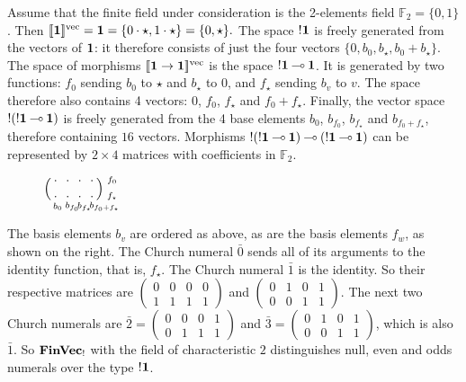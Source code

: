 \documentclass[10pt]{article}
\theoremstyle{plain}
\theoremstyle{definition}
\newcommand{\loli}{\mathbin{\multimap}}
\newcommand{\FinVec}{\mbox{\bf FinVec}}
\newcommand{\tunit}{{\bf 1}}
\newcommand{\fvdenot}[1]{{[\![{#1}]\!]^{\rm vec}}}
\begin{document}
  Assume that the finite field under consideration is the 2-elements
  field $\mathbb{F}_2=\{0,1\}$. Then
  $
  \fvdenot{\tunit} = \tunit = \{0\cdot\star,1\cdot\star\} = \{0,\star\}.
  $
  The space $!\tunit$ is freely generated from the vectors of $\tunit$: it
  therefore consists of just the four vectors $\{0,b_0,b_\star,b_0+b_\star\}$.
  The space of morphisms $\fvdenot{\tunit\to\tunit}$ is the space
  ${!\tunit}\loli\tunit$. It is generated by two functions:
  $f_0$ sending $b_0$ to $\star$ and $b_\star$ to $0$, and $f_\star$
  sending $b_v$ to $v$. The space 
  therefore also contains 4 vectors: $0$, $f_0$, $f_\star$ and
  $f_0+f_\star$. Finally, the vector space ${!}({!\tunit}\loli\tunit)$
  is freely generated from the 4 base elements $b_0$, $b_{f_0}$,
  $b_{f_\star}$ and $b_{f_0+f_\star}$, therefore containing $16$
  vectors. Morphisms
  $!({!\tunit}\loli\tunit)\loli({!\tunit}\loli\tunit)$ can be
  represented by $2\times 4$ matrices with coefficients in
  $\mathbb{F}_2$. 
\begin{wrapfigure}{r}{0.24\textwidth}
\begin{minipage}{.2\textwidth}
  $\xy
  <1.5ex,0ex>:
  (1,0)*{\cdot};
  (0,1)*{\Big(\Big.};
  (1,2)*{\cdot};
  (2.5,0)*{\cdot};
  (2.5,2)*{\cdot};
  (4,0)*{\cdot};
  (4,2)*{\cdot};
  (5.5,0)*{\cdot};
  (5.5,2)*{\cdot};
  (6.5,1)*{\Big.\Big)};
  (8,0.1)*\txt{{\scriptsize $f_\star$}};
  (8,2.1)*\txt{{\scriptsize $f_0$}};
  (0.7,-1.2)*!L\txt{{\scriptsize $b_{0}$}};
  (2.2,-1.2)*!L\txt{{\scriptsize $b_{f_0}$}};
  (3.7,-1.2)*!L\txt{{\scriptsize $b_{f_\star}$}};
  (5.2,-1.2)*!L\txt{{\scriptsize $b_{f_0+f_\star}$}};
  \endxy$
\end{minipage}
\end{wrapfigure}
The basis elements $b_v$ are ordered as above, as
  are the basis elements $f_w$, as shown on the right.
  The Church numeral $\bar{0}$ sends all of its arguments to the
  identity function, that is, $f_\star$. The Church numeral $\bar{1}$
  is the identity. So their respective matrices are
  $\left(\begin{smallmatrix}
    0&0&0&0\\
    1&1&1&1
  \end{smallmatrix}\right)$
  and
  $\left(\begin{smallmatrix}
    0&1&0&1\\
    0&0&1&1
  \end{smallmatrix}\right)$.
  The next two Church numerals are
  $\bar{2} = 
  \left(\begin{smallmatrix}
    0&0&0&1
    \\
    0&1&1&1
  \end{smallmatrix}\right)$ and
  $\bar{3} = 
  \left(\begin{smallmatrix}
    0&1&0&1\\
    0&0&1&1
  \end{smallmatrix}\right)$, which is also $\bar{1}$.
  So ${\FinVec}_!$ with the field of characteristic $2$ distinguishes
  null, even and odds numerals over the type $!\tunit$.
\end{document}
